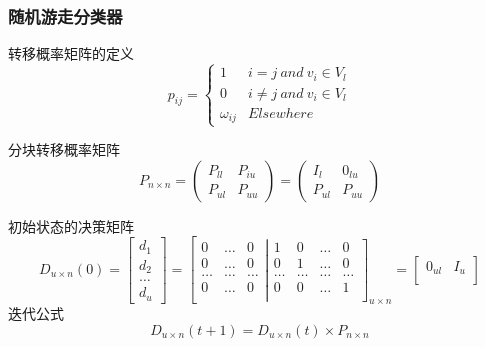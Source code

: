 \documentclass[notheorems, UTF8]{beamer}
\theoremstyle{plain}
\begin{document}
\begin{frame}
\frametitle{随机游走分类器}
转移概率矩阵的定义
\begin{displaymath}
p_{ij} = \left\{
\begin{array}{ll}
1 & i = j   \ and\ v_i \in V_l \\
0 & i \neq j\ and\ v_i \in V_l \\
\omega_{ij} & Elsewhere
\end{array}
\right .
\end{displaymath}

分块转移概率矩阵
\begin{displaymath}
P_{n \times n} = \left(
\begin{array}{ll}
P_{ll} & P_{iu}\\
P_{ul} & P_{uu} 
\end{array}
\right)=\left(
\begin{array}{ll}
I_{l}  & 0_{lu}\\
P_{ul} & P_{uu} 
\end{array}
\right)
\end{displaymath}

初始状态的决策矩阵
\begin{displaymath}
D_{u \times n}(0) = \left[
\begin{array}{c}
d_1 \\
d_2 \\
\ldots \\
d_u
\end{array}
\right] = \left[
\begin{array}{ccc}
0 & \ldots & 0\\
0 & \ldots & 0\\
\ldots & \ldots & \ldots\\
0 & \ldots & 0\\
\end{array}
\left | 
\begin{array}{cccc}
1 & 0 & \ldots & 0 \\
0 & 1 & \ldots & 0 \\
\ldots & \ldots &\ldots & \ldots \\
0 & 0 & \ldots & 1 \\
\end{array}
\right]_{u \times n} = 
\left[
\begin{array}{cc}
0_{u l} & I_{u} \\
\end{array}
\right ]\right.
\end{displaymath}
迭代公式
\begin{displaymath}
D_{u \times n}(t + 1) = D_{u \times n}(t) \times P_{n \times n}
\end{displaymath}
\end{frame}
\end{document}
